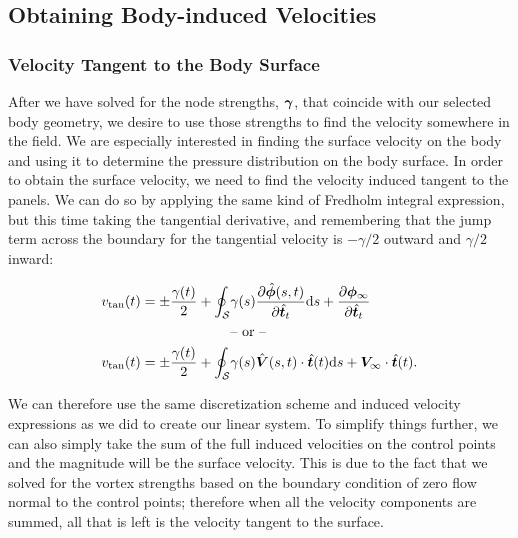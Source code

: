 \subsection{Obtaining Body-induced Velocities}

\subsubsection{Velocity Tangent to the Body Surface}
\label{sssec:vtanbody}

After we have solved for the node strengths, \(\bm{\gamma}\), that coincide with our selected body geometry, we desire to use those strengths to find the velocity somewhere in the field.
%
We are especially interested in finding the surface velocity on the body and using it to determine the pressure distribution on the body surface.
%
In order to obtain the surface velocity, we need to find the velocity induced tangent to the panels.
%
We can do so by applying the same kind of Fredholm integral expression, but this time taking the tangential derivative, and remembering that the jump term across the boundary for the tangential velocity is \(-\gamma/2\) outward and \(\gamma/2\) inward:

\begin{subequations}
    \label{eqn:fredholmtan}
    \begin{align}
        v_\text{tan}(t) = \pm \frac{\gamma(t)}{2} + \oint_\mathcal{S}& \gamma(s) \frac{\partial \hat{\bm{\phi}}(s,t)}{\partial \hat{\bm{t}}_t} \mathrm{d} s  +\frac{\partial \bm{\phi}_\infty}{\partial \hat{\bm{t}}_t} \\
                                               & \text{-- or --} \notag\\
        v_\text{tan}(t) = \pm \frac{\gamma(t)}{2} + \oint_\mathcal{S} &\gamma(s) \hat{\bm{V}}(s,t)\cdot\hat{\bm{t}}(t) \mathrm{d} s + \bm{V}_\infty\cdot\hat{\bm{t}}(t).
   \end{align}
\end{subequations}

We can therefore use the same discretization scheme and induced velocity expressions as we did to create our linear system.
%
To simplify things further, we can also simply take the sum of the full induced velocities on the control points and the magnitude will be the surface velocity.
%
This is due to the fact that we solved for the vortex strengths based on the boundary condition of zero flow normal to the control points; therefore when all the velocity components are summed, all that is left is the velocity tangent to the surface.


